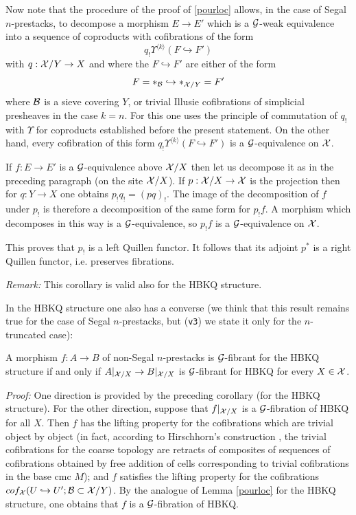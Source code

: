 Now note that the procedure of the proof of \ref{pourloc} allows, in the
case of Segal $n$-prestacks, to decompose a morphism $E\rightarrow E'$
which is a ${\cal G}$-weak equivalence into a sequence of coproducts with
cofibrations of the form
$$
q_!\Upsilon ^{\langle k \rangle } (F\hookrightarrow F')
$$
with $q: {\cal X} /Y\rightarrow X$ and
where the $F\hookrightarrow F'$ are either of the form
$$
F = \ast _{{\cal B}} \hookrightarrow \ast _{{\cal X} /Y} = F'
$$
where ${\cal B}$ is a sieve covering $Y$, or
trivial Illusie cofibrations
of simplicial presheaves in the case $k=n$. For this
one uses the principle of
commutation of $q_!$ with $\Upsilon$ for coproducts established before the
present statement.
On the other hand, every cofibration of this form
$q_!\Upsilon ^{\langle k \rangle } (F\hookrightarrow F')$ is a
${\cal G}$-equivalence on ${\cal X}$.

If $f:E\rightarrow E'$ is a ${\cal G}$-equivalence above ${\cal X} / X$ then
let us decompose it as in the preceding paragraph (on the site ${\cal X} /X$).
If $p: {\cal X} /X\rightarrow {\cal X}$ is the projection then for $q: Y\rightarrow X$
one obtains $p_! q_! = (pq)_!$. The image of the decomposition of
$f$ under $p_!$ is therefore a decomposition of the same form for $p_!f$.
A morphism which decomposes in this way is a ${\cal G}$-equivalence, so
$p_!f$ is a ${\cal G}$-equivalence on ${\cal X}$.

This proves that $p_!$ is a left
Quillen functor. It follows that its adjoint $p^{\ast}$ is a right
Quillen functor, i.e. preserves fibrations.
\eop

{\em Remark:} This corollary is valid also for the HBKQ structure.

In the HBKQ structure one also has a converse
(we think that this result
remains true for the case of Segal $n$-prestacks, but ({\tt v3})
we state it
only for the $n$-truncated case):

\begin{corollary}
\label{restrpourhbkq}
A morphism $f: A\rightarrow B$ of non-Segal $n$-prestacks
is ${\cal G}$-fibrant for the HBKQ structure
if and only if $A|_{{\cal X} /X} \rightarrow B|_{{\cal X} /X}$ is ${\cal G}$-fibrant for
HBKQ for every $X\in {\cal X}$.
\end{corollary}
{\em Proof:}
One direction is provided by the preceding corollary (for the
HBKQ structure). For the other direction, suppose that $f|_{{\cal X} /X}$ is a
${\cal G}$-fibration of HBKQ for all $X$. Then $f$ has the lifting
property for the cofibrations which are trivial object by object
(in fact, according to Hirschhorn's construction
\cite{Hirschhorn}, the trivial cofibrations
for the coarse topology are retracts of composites of sequences
of cofibrations obtained by free addition of cells corresponding
to
trivial cofibrations in the base cmc $M$); and $f$ satisfies the
lifting property for the cofibrations
$cof_{{\cal X} }(U\hookrightarrow U'; {\cal B} \subset {\cal X} /Y)$. By the analogue of
Lemma \ref{pourloc} for the HBKQ structure, one obtains that $f$ is a
${\cal G}$-fibration of HBKQ.
\eop


